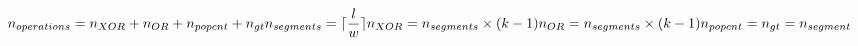 \begin{equation}
\nonumber
n_{operations} = n_{XOR} + n_{OR} + n_{popcnt} + n_{gt} \\
n_{segments} =  \lceil \frac{l}{w} \rceil \\
n_{XOR} = n_{segments} \times (k-1) \\
n_{OR} = n_{segments} \times (k-1) \\
n_{popcnt} = n_{gt} = n_{segment} \\

\end{equation}  
  
  
  
  
  
  
  
  
  
  
  
  
  